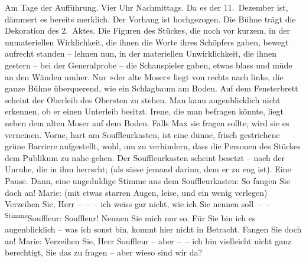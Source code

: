 \begin{ledgroupsized}[t]{13cm}
           {\bigskip}\pstart
           \noindent{}Am Tage der Aufführung. Vier Uhr Nachmittags. Da es der 11. Dezember
               ist, dämmert es bereits merklich. Der Vorhang ist hochgezogen. Die Bühne trägt die
               Dekoration des 2. Aktes. Die
               Figuren des Stückes, die noch vor kurzem, in der unmateriellen Wirklichkeit, die
               ihnen die Worte ihres Schöpfers gaben, bewegt aufrecht standen – lehnen nun, in der
               materiellen Unwirklichkeit, die ihnen gestern – bei der Generalprobe – die
               Schauspieler gaben, etwas blass und müde an den Wänden umher. Nur »der alte Moser«
               liegt von rechts nach links, die ganze Bühne überquerend, wie ein Schlagbaum am
               Boden. Auf dem Fensterbrett scheint der Oberleib des Obersten zu stehen. Man kann
               augenblicklich nicht erkennen, ob er einen Unterleib besitzt. Irene, die man befragen
               könnte, liegt neben dem alten Moser auf dem Boden. Falls Max sie fragen sollte, wird
               sie es verneinen.\pend
           \pstart
           Vorne, hart am Souffleurkasten, ist eine dünne, frisch gestrichene grüne Barriere
               aufgestellt, wohl, um zu verhindern, dass die Person\introOben{}en\introOben{} des
               Stückes dem Publikum zu nahe gehen. Der Souffleurkasten scheint besetzt – nach der
               Unruhe, die in ihm herrscht; (als sässe jemand darinn, dem er zu eng
               ist).\pend
           \pstart
           Eine Pause.\pend
           \pstart
           Dann, eine ungeduldige Stimme aus dem Souffleurkasten:\pend
           \pstart
           {\pb}So fangen Sie doch an!\pend
           \pstart
           Marie: (mit etwas starren Augen, leise, und ein wenig verlegen) Verzeihen Sie, Herr
               – – – ich weiss gar nicht, wie ich Sie nennen soll – –\pend
           \pstart
           \substVorne{}\textsuperscript{Stimme}{\allowbreak}\substDazwischen{}Souffleur\substHinten{}: Souffleur! Nennen Sie mich nur so. Für Sie bin ich es augenblicklich – was
               ich sonst bin, kommt hier nicht in Betracht. Fangen Sie doch an!\pend
           \pstart
           Marie: Verzeihen Sie, Herr Souffleur – aber – – ich bin vielleicht nicht ganz
               berechtigt, Sie das zu fragen – aber wieso sind wir da?\pend

\end{ledgroupsized}
